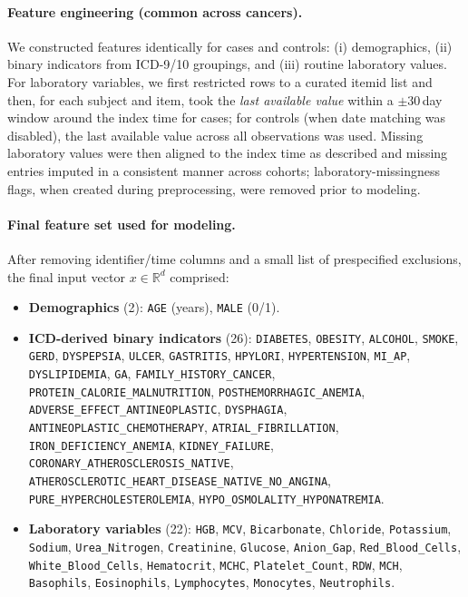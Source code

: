 \documentclass[journal,article,submit,pdftex,moreauthors]{Definitions/mdpi}
\begin{document}
\paragraph{Feature engineering (common across cancers).}
We constructed features identically for cases and controls: (i) demographics, (ii) binary indicators from ICD-9/10 groupings, and (iii) routine laboratory values. For laboratory variables, we first restricted rows to a curated itemid list and then, for each subject and item, took the \emph{last available value} within a $\pm30$\,day window around the index time for cases; for controls (when date matching was disabled), the last available value across all observations was used. Missing laboratory values were then aligned to the index time as described and missing entries imputed in a consistent manner across cohorts; laboratory-missingness flags, when created during preprocessing, were removed prior to modeling.

\paragraph{Final feature set used for modeling.}
After removing identifier/time columns and a small list of prespecified exclusions, the final input vector $x\in\mathbb{R}^d$ comprised:
\begin{itemize}[leftmargin=12pt,topsep=2pt,itemsep=1pt]
  \item \textbf{Demographics} (2): \texttt{AGE} (years), \texttt{MALE} (0/1).
  \item \textbf{ICD-derived binary indicators} (26): \texttt{DIABETES}, \texttt{OBESITY}, \texttt{ALCOHOL}, \texttt{SMOKE}, \texttt{GERD}, \texttt{DYSPEPSIA}, \texttt{ULCER}, \texttt{GASTRITIS}, \texttt{HPYLORI}, \texttt{HYPERTENSION}, \texttt{MI\_AP}, \texttt{DYSLIPIDEMIA}, \texttt{GA}, \texttt{FAMILY\_HISTORY\_CANCER}, \texttt{PROTEIN\_CALORIE\_MALNUTRITION}, \texttt{POSTHEMORRHAGIC\_ANEMIA}, \texttt{ADVERSE\_EFFECT\_ANTINEOPLASTIC}, \texttt{DYSPHAGIA}, \texttt{ANTINEOPLASTIC\_CHEMOTHERAPY}, \texttt{ATRIAL\_FIBRILLATION}, \texttt{IRON\_DEFICIENCY\_ANEMIA}, \texttt{KIDNEY\_FAILURE}, \texttt{CORONARY\_ATHEROSCLEROSIS\_NATIVE}, \texttt{ATHEROSCLEROTIC\_HEART\_DISEASE\_NATIVE\_NO\_ANGINA}, \texttt{PURE\_HYPERCHOLESTEROLEMIA}, \texttt{HYPO\_OSMOLALITY\_HYPONATREMIA}.
  \item \textbf{Laboratory variables} (22): \texttt{HGB}, \texttt{MCV}, \texttt{Bicarbonate}, \texttt{Chloride}, \texttt{Potassium}, \texttt{Sodium}, \texttt{Urea\_Nitrogen}, \texttt{Creatinine}, \texttt{Glucose}, \texttt{Anion\_Gap}, \texttt{Red\_Blood\_Cells}, \texttt{White\_Blood\_Cells}, \texttt{Hematocrit}, \texttt{MCHC}, \texttt{Platelet\_Count}, \texttt{RDW}, \texttt{MCH}, \texttt{Basophils}, \texttt{Eosinophils}, \texttt{Lymphocytes}, \texttt{Monocytes}, \texttt{Neutrophils}.
\end{itemize}
\end{document}
